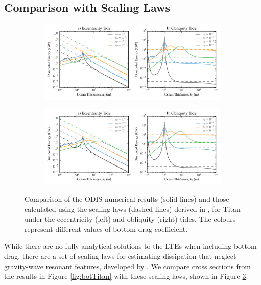 \subsection{Comparison with Scaling Laws \label{subsec:scalTitan}}

\begin{figure}[!t]
    \centering
    \begin{subfigure}[t]{0.95\linewidth} %
        \includegraphics[width=\linewidth]{Figures/titan_scaling}
        \label{fig:scalEccTitan}
    \end{subfigure}
    \begin{subfigure}[t]{0\linewidth} %
         \includegraphics[width=\linewidth]{Figures/titan_scaling}
         \label{fig:scalObliqTitan} 
    \end{subfigure}
    \vspace{-0.5cm}
\caption{Comparison of the ODIS numerical results (solid lines) and those calculated using the scaling laws (dashed lines) derived in \citet{chen2013tidal}, for Titan under the eccentricity (left) and obliquity (right) tides. The colours represent different values of bottom drag coefficient.\label{fig:scalTitan}}
\end{figure}

While there are no fully analytical solutions to the LTEs when including bottom drag, there are a set of scaling laws for estimating dissipation that neglect gravity-wave resonant features, developed by \citet{chen2013tidal}. We compare cross sections from the results in Figure \ref{fig:botTitan} with these scaling laws, shown in Figure \ref{fig:scalTitan}.

